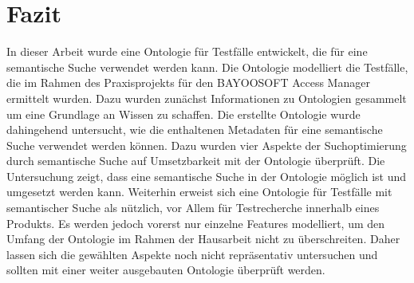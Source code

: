 \chapter{Fazit}
In dieser Arbeit wurde eine Ontologie für Testfälle entwickelt, die für eine semantische Suche verwendet werden kann. Die Ontologie modelliert die Testfälle, die im Rahmen des Praxisprojekts für den BAYOOSOFT Access Manager ermittelt wurden. Dazu wurden zunächst Informationen zu Ontologien gesammelt um eine Grundlage an Wissen zu schaffen. Die erstellte Ontologie wurde dahingehend untersucht, wie die enthaltenen Metadaten für eine semantische Suche verwendet werden können. Dazu wurden vier Aspekte der Suchoptimierung durch semantische Suche auf Umsetzbarkeit mit der Ontologie überprüft. Die Untersuchung zeigt, dass eine semantische Suche in der Ontologie möglich ist und umgesetzt werden kann. Weiterhin erweist sich eine Ontologie für Testfälle mit semantischer Suche als nützlich, vor Allem für Testrecherche innerhalb eines Produkts. Es werden jedoch vorerst nur einzelne Features modelliert, um den Umfang der Ontologie im Rahmen der Hausarbeit nicht zu überschreiten. Daher lassen sich die gewählten Aspekte noch nicht repräsentativ untersuchen und sollten mit einer weiter ausgebauten Ontologie überprüft werden.
